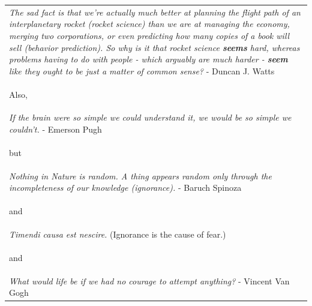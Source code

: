 \documentclass[hidelinks,11pt,a4paper]{report}
\begin{document}


\setcounter{page}{1}





\begin{table}[]
    \centering
    \begin{tabularx}{1\textwidth}{X}
        

        \textit{The sad fact is that we're actually much better at planning the flight path of an interplanetary rocket (rocket science) than we are at managing the economy, merging two corporations, or even predicting how many copies of a book will sell (behavior prediction). So why is it that rocket science \textbf{seems} hard, whereas problems having to do with people - which arguably are much harder - \textbf{seem} like they ought to be just a matter of common sense?} - Duncan J. Watts\\

        \begin{center}
                Also,
        \end{center}\\
        
        \textit{If the brain were so simple we could understand it, we would be so simple we couldn't.} - Emerson Pugh\\
        
        \begin{center}
            but
        \end{center}\\
        
        \textit{Nothing in Nature is random. A thing appears random only through the incompleteness of our knowledge (ignorance).} - Baruch Spinoza\\

        \begin{center}
                and
        \end{center}\\
        
        \textit{Timendi causa est nescire.} (Ignorance is the cause of fear.)\\
        
        \begin{center}
                and
        \end{center}\\
        
        \textit{What would life be if we had no courage to attempt anything?} - Vincent Van Gogh\\
        
    \end{tabularx}
    
\end{table}
\end{document}
